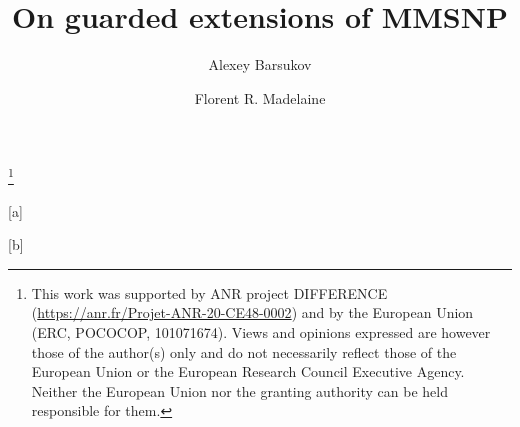 \documentclass{lmcs}
\begin{document}
\title[On guarded extensions of MMSNP]{On guarded extensions of MMSNP}
\thanks{This work was supported by ANR project DIFFERENCE (\url{https://anr.fr/Projet-ANR-20-CE48-0002}) and by the European Union (ERC, POCOCOP, 101071674). Views and opinions expressed are however those of the author(s) only and do not necessarily reflect those of the European Union or the European Research Council Executive Agency. Neither the European Union nor the granting authority can be held responsible for them.}  %

\author[A.~Barsukov]{Alexey Barsukov}[a]
\author[F.~Madelaine]{Florent R. Madelaine}[b]

\address{Department of Algebra, Faculty of Mathematics and Physics, Charles University, Sokolovsk{\'a} 49/83, 186 00 Prague 8, Czechia}  %

\address{Univ Paris Est Creteil, LACL, F-94010 Creteil, France}  %
\end{document}
